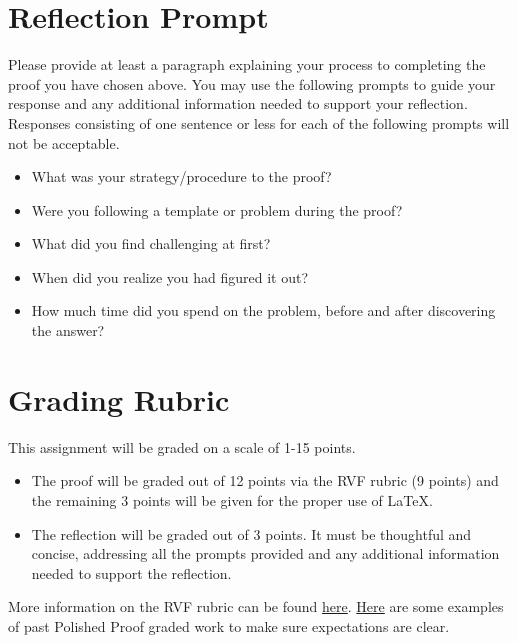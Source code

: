\documentclass{article}
\theoremstyle{definition}
\begin{document}
\section*{Reflection Prompt}
    Please provide at least a paragraph explaining your process to completing the proof you have chosen above. You may use the following prompts to guide your response and any additional information needed to support your reflection. Responses consisting of one sentence or less for each of the following prompts will not be acceptable.
    \begin{itemize}
        \item What was your strategy/procedure to the proof?
        \item Were you following a template or problem during the proof?
        \item What did you find challenging at first?
        \item When did you realize you had figured it out?
        \item How much time did you spend on the problem, before and after discovering the answer?
    \end{itemize}

\section*{Grading Rubric}
    This assignment will be graded on a scale of 1-15 points.
    \begin{itemize}
    \item The proof will be graded out of 12 points via the RVF rubric (9 points) and the remaining 3 points will be given for the proper use of \LaTeX.
    \item The reflection will be graded out of 3 points. It must be thoughtful and concise, addressing all the prompts provided and any additional information needed to support the reflection.
    \end{itemize}
     
    More information on the RVF rubric can be found 
    \href{https://drive.google.com/file/d/1P0OBjw-GkX64uCpYcqYmXARapf9MwaiI/view?usp=sharing}{here}. 
    \href{https://drive.google.com/file/d/1KAFQ7GBFpfUkyTBRZ30h5o6nXWwYDSML/view?usp=sharing}{Here} 
    are some examples of past Polished Proof graded work to make sure expectations are clear. 
	
\end{document}
